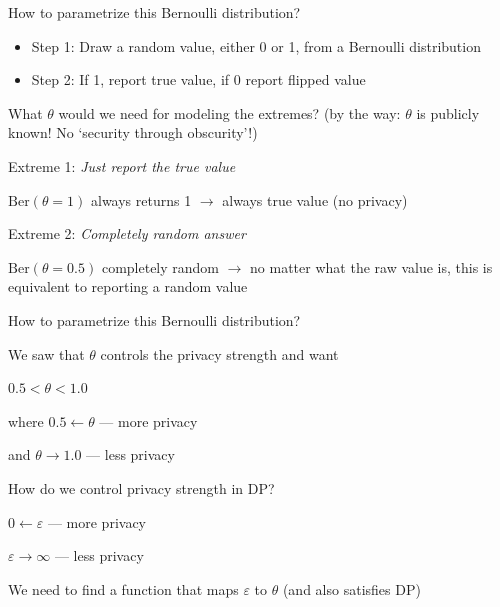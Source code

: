 \documentclass[12pt,aspectratio=169,handout]{beamer}
\begin{document}
\begin{frame}{How to parametrize this Bernoulli distribution?}

\begin{itemize}
\item Step 1: Draw a random value, either 0 or 1, from a Bernoulli distribution
\item Step 2: If 1, report true value, if 0 report flipped value
\end{itemize}

What $\theta$ would we need for modeling the extremes? (by the way: $\theta$ is publicly known! No `security through obscurity'!)

Extreme 1: \emph{Just report the true value}

\pause

$\mathrm{Ber}(\theta = 1)$ always returns 1 $\rightarrow$ always true value (no privacy)

Extreme 2: \emph{Completely random answer}

\pause

$\mathrm{Ber}(\theta = 0.5)$ completely random $\rightarrow$ no matter what the raw value is, this is equivalent to reporting a random value



\end{frame}

\begin{frame}{How to parametrize this Bernoulli distribution?}

We saw that $\theta$ controls the privacy strength and want

$0.5 < \theta < 1.0$

where $0.5 \leftarrow \theta$ --- more privacy

and $\theta \rightarrow 1.0$ --- less privacy


How do we control privacy strength in DP?

$0 \leftarrow \varepsilon$ --- more privacy

$\varepsilon \rightarrow \infty$ --- less privacy

We need to find a function that maps $\varepsilon$ to $\theta$ (and also satisfies DP)
\end{frame}
\end{document}
